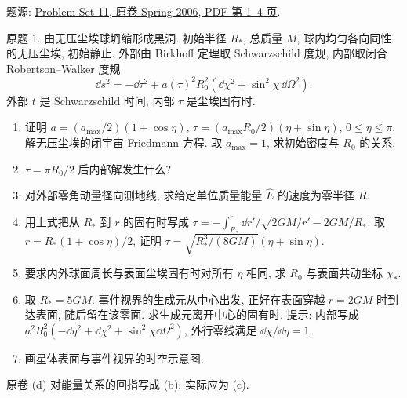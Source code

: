 题源: \href{https://ocw.mit.edu/courses/8-962-general-relativity-spring-2020/resources/mit8_962s20_pset11/}{Problem Set 11, 原卷 Spring 2006, PDF 第 1--4 页}.

\begin{exercise}\label{ps:11.1}
原题 1. 由无压尘埃球坍缩形成黑洞. 初始半径 $R_*$, 总质量 $M$, 球内均匀各向同性的无压尘埃, 初始静止. 外部由 Birkhoff 定理取 Schwarzschild 度规, 内部取闭合 Robertson--Walker 度规
\[
\dd s^2=-\dd\tau^2+a(\tau)^2R_0^2(\dd\chi^2+\sin^2\chi\,\dd\Omega^2).
\]
外部 $t$ 是 Schwarzschild 时间, 内部 $\tau$ 是尘埃固有时.
\begin{enumerate}[label=(\alph*)]
\item 证明 $a=(a_{\max}/2)(1+\cos\eta)$, $\tau=(a_{\max}R_0/2)(\eta+\sin\eta)$, $0\le\eta\le\pi$, 解无压尘埃的闭宇宙 Friedmann 方程. 取 $a_{\max}=1$, 求初始密度与 $R_0$ 的关系.
\item $\tau=\pi R_0/2$ 后内部解发生什么?
\item 对外部零角动量径向测地线, 求给定单位质量能量 $\hat E$ 的速度为零半径 $R$.
\item 用上式把从 $R_*$ 到 $r$ 的固有时写成 $\tau=-\int_{R_*}^{r}\dd r'/\sqrt{2GM/r'-2GM/R_*}$. 取 $r=R_*(1+\cos\eta)/2$, 证明 $\tau=\sqrt{R_*^3/(8GM)}(\eta+\sin\eta)$.
\item 要求内外球面周长与表面尘埃固有时对所有 $\eta$ 相同, 求 $R_0$ 与表面共动坐标 $\chi_*$.
\item 取 $R_*=5GM$. 事件视界的生成元从中心出发, 正好在表面穿越 $r=2GM$ 时到达表面, 随后留在该零面. 求生成元离开中心的固有时. 提示: 内部写成 $a^2R_0^2(-\dd\eta^2+\dd\chi^2+\sin^2\chi\dd\Omega^2)$, 外行零线满足 $\dd\chi/\dd\eta=1$.
\item 画星体表面与事件视界的时空示意图.
\end{enumerate}
原卷 (d) 对能量关系的回指写成 (b), 实际应为 (c).
\end{exercise}
